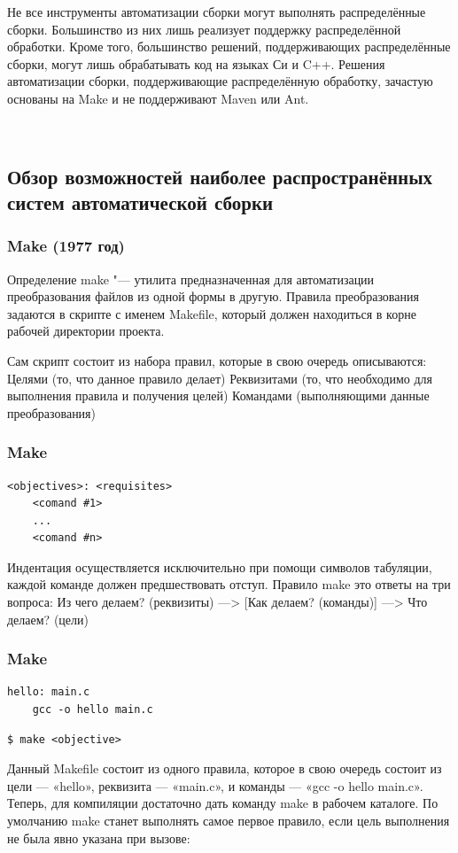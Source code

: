 \documentclass{../industrial-development}
\begin{document}
Не все инструменты автоматизации сборки могут выполнять распределённые сборки. Большинство из них лишь реализует поддержку распределённой обработки. Кроме того, большинство решений, поддерживающих распределённые сборки, могут лишь обрабатывать код на языках Си и C++. Решения автоматизации сборки, поддерживающие распределённую обработку, зачастую основаны на Make и не поддерживают Maven или Ant.

~\cite{Wiki_Build_automation}

\subsection{Обзор возможностей наиболее распространённых систем автоматической сборки}


\begin{frame} \frametitle{Make (1977 год)}
	\begin{block}{Определение}
		make "--- утилита предназначенная для автоматизации преобразования файлов из одной формы в другую. Правила преобразования задаются в скрипте с именем Makefile, который должен находиться в корне рабочей директории проекта.
	\end{block}	
\end{frame}
\lecturenotes
Сам скрипт состоит из набора правил, которые в свою очередь описываются:
 Целями (то, что данное правило делает)
 Реквизитами (то, что необходимо для выполнения правила и получения целей)
 Командами (выполняющими данные преобразования)
~\cite{Habr_make}

\begin{frame}[fragile] \frametitle{Make}
\begin{lstlisting}[label=some-code,caption=Синтаксис makefile в общем виде]
<objectives>: <requisites>
	<comand #1>
	...
	<comand #n>

\end{lstlisting}

\end{frame}
\lecturenotes
Индентация осуществляется исключительно при помощи символов табуляции, каждой команде должен предшествовать отступ.
Правило make это ответы на три вопроса:
{Из чего делаем? (реквизиты)} ---> [Как делаем? (команды)] ---> {Что делаем? (цели)}

\begin{frame}[fragile] \frametitle{Make}
\begin{lstlisting}[label=some-code,caption=Простейший Makefile]
hello: main.c
	gcc -o hello main.c
\end{lstlisting}
\begin{lstlisting}[label=some-code,caption=Команда для компиляции]
$ make <objective>
\end{lstlisting}

\end{frame}
\lecturenotes
Данный Makefile состоит из одного правила, которое в свою очередь состоит из цели — «hello», реквизита — «main.c», и команды — «gcc -o hello main.c». Теперь, для компиляции достаточно дать команду make в рабочем каталоге. По умолчанию make станет выполнять самое первое правило, если цель выполнения не была явно указана при вызове:
\end{document}
